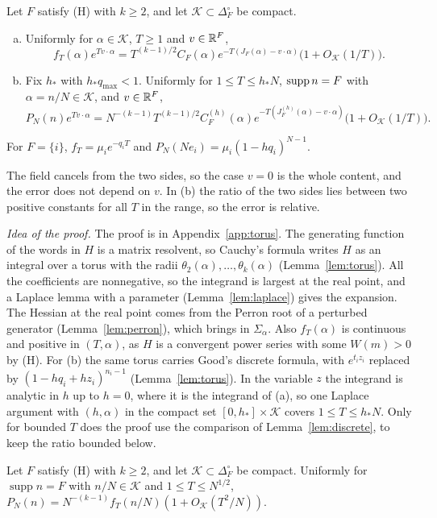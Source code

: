 \begin{theorem}\label{thm:local}
Let $F$ satisfy \textup{(H)} with $k\ge2$, and let $\mathcal K\subset\Delta_F^\circ$ be
compact.
\begin{enumerate}[(a)]
\item Uniformly for $\alpha\in\mathcal K$, $T\ge1$ and $v\in\mathbb{R}^F$,
\[
f_T(\alpha)e^{Tv\cdot\alpha}=T^{(k-1)/2}C_F(\alpha)e^{-T(J_F(\alpha)-v\cdot\alpha)}\bigl(1+O_{\mathcal K}(1/T)\bigr).
\]
\item Fix $h_*$ with $h_*q_{\max}<1$. Uniformly for $1\le T\le h_*N$,
$\operatorname{supp} n=F$ with $\alpha=n/N\in\mathcal K$, and $v\in\mathbb{R}^F$,
\[
P_N(n)e^{Tv\cdot\alpha}=N^{-(k-1)}T^{(k-1)/2}C^{(h)}_F(\alpha)
e^{-T(J^{(h)}_F(\alpha)-v\cdot\alpha)}\bigl(1+O_{\mathcal K}(1/T)\bigr).
\]
\end{enumerate}
For $F=\{i\}$, $f_T=\mu_ie^{-q_iT}$ and $P_N(Ne_i)=\mu_i(1-hq_i)^{N-1}$.
\end{theorem}

The field cancels from the two sides, so the case $v=0$ is the whole content, and the
error does not depend on $v$. In (b) the ratio of the two sides lies between two
positive constants for all $T$ in the range, so the error is relative.

\emph{Idea of the proof.} The proof is in Appendix~\ref{app:torus}. The
generating function of the words in $H$ is a matrix resolvent, so
Cauchy's formula writes $H$ as an integral over a torus with the radii
$\theta_2(\alpha),\dots,\theta_k(\alpha)$ (Lemma~\ref{lem:torus}).
All the coefficients are nonnegative, so the integrand is largest at the real
point, and a Laplace lemma with a parameter (Lemma~\ref{lem:laplace}) gives the
expansion. The Hessian at the real point comes from the Perron root of a
perturbed generator (Lemma~\ref{lem:perron}), which brings in $\Sigma_\alpha$.
Also $f_T(\alpha)$ is continuous and positive in $(T,\alpha)$, as
$H$ is a convergent power series with some $W(m)>0$ by (H). For (b) the same torus
carries Good's discrete formula, with $e^{t_iz_i}$ replaced by $(1-hq_i+hz_i)^{n_i-1}$
(Lemma~\ref{lem:torus}). In the variable $z$ the integrand is analytic in $h$ up to
$h=0$, where it is the integrand of (a), so one Laplace argument with $(h,\alpha)$ in
the compact set $[0,h_*]\times\mathcal K$ covers $1\le T\le h_*N$. Only for
bounded $T$ does the proof use the comparison of Lemma~\ref{lem:discrete}, to keep
the ratio bounded below.

\begin{lemma}\label{lem:discrete}
Let $F$ satisfy \textup{(H)} with $k\ge2$, and let $\mathcal K\subset\Delta_F^\circ$ be
compact. Uniformly for $\operatorname{supp}n=F$ with $n/N\in\mathcal K$ and
$1\le T\le N^{1/2}$,
$P_N(n)=N^{-(k-1)}f_T(n/N)(1+O_{\mathcal K}(T^2/N))$.
\end{lemma}

